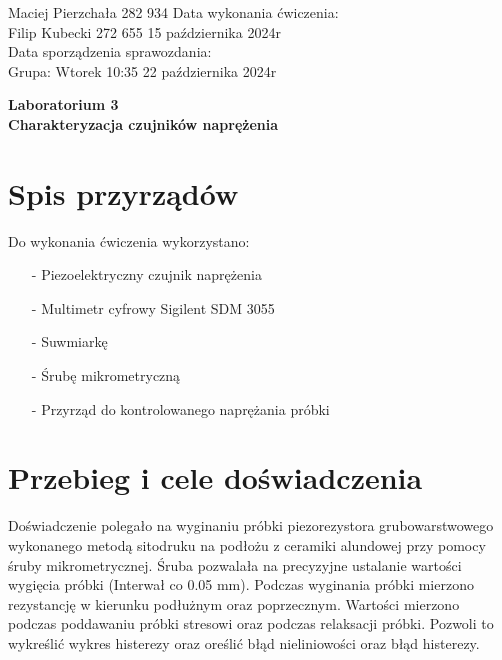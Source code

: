 \documentclass[11pt]{article}
\begin{document}
    \begin{flushleft}
        Maciej Pierzchała 282 934 \hfill Data wykonania ćwiczenia:\\
        Filip Kubecki 272 655 \hfill 15 października 2024r\\
        \hfill Data sporządzenia sprawozdania:\\
        Grupa: Wtorek 10:35 \hfill 22 października 2024r\\
    \end{flushleft}

    \begin{center}
        \Large\textbf{Laboratorium 3}\\
        \textbf{Charakteryzacja czujników naprężenia}
    \end{center}
    \hfill
    \section{Spis przyrządów}
    \par{
        Do wykonania ćwiczenia wykorzystano:
        \begin{itemize}
            \setlength\itemsep{0em}
            \item[-] Piezoelektryczny czujnik naprężenia
            \item[-] Multimetr cyfrowy Sigilent SDM 3055
            \item[-] Suwmiarkę
            \item[-] Śrubę mikrometryczną
            \item[-] Przyrząd do kontrolowanego naprężania próbki
        \end{itemize}
    }
    \section{Przebieg i cele doświadczenia}
    \par Doświadczenie polegało na wyginaniu próbki piezorezystora grubowarstwowego wykonanego metodą sitodruku na podłożu z ceramiki
    alundowej przy pomocy śruby mikrometrycznej. Śruba pozwalała na precyzyjne ustalanie wartości wygięcia próbki (Interwał co 0.05 mm).
    Podczas wyginania próbki mierzono rezystancję w kierunku podłużnym oraz poprzecznym. Wartości mierzono podczas poddawaniu próbki stresowi
    oraz podczas relaksacji próbki. Pozwoli to wykreślić wykres histerezy oraz oreślić błąd nieliniowości oraz błąd histerezy.
\end{document}

